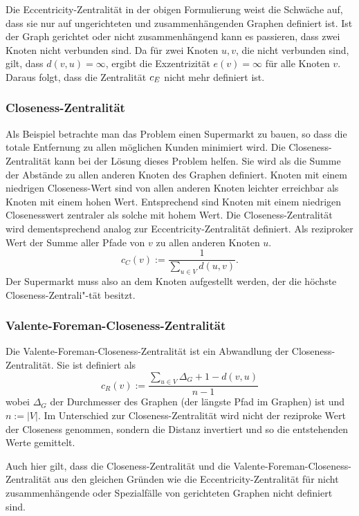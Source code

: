 Die Eccentricity-Zentralität in der obigen Formulierung weist die Schwäche auf, dass sie nur auf ungerichteten und zusammenhängenden Graphen definiert ist. Ist der Graph gerichtet oder nicht zusammenhängend kann es passieren, dass zwei Knoten nicht verbunden sind. Da für zwei Knoten $u,v$, die nicht verbunden sind, gilt, dass $d(v,u) = \infty$, ergibt die Exzentrizität $e(v) = \infty$ für alle Knoten $v$. Daraus folgt, dass die Zentralität $c_{E}$ nicht mehr definiert ist.

\subsubsection{Closeness-Zentralität}

Als Beispiel betrachte man das Problem einen Supermarkt zu bauen, so dass die totale Entfernung zu allen möglichen Kunden minimiert wird. Die Closeness-Zentralität kann bei der Lösung dieses Problem helfen. Sie wird als die Summe der Abstände zu allen anderen Knoten des Graphen definiert. Knoten mit einem niedrigen Closeness-Wert sind von allen anderen Knoten leichter erreichbar als Knoten mit einem hohen Wert. Entsprechend sind Knoten mit einem niedrigen Closenesswert zentraler als solche mit hohem Wert. Die Closeness-Zentralität wird dementsprechend analog zur Eccentricity-Zentralität definiert. Als reziproker Wert der Summe aller Pfade von $v$ zu allen anderen Knoten $u$.
\[c_C(v) := \frac{1}{\sum_{u \in V}d(u,v)}\mbox{.}\]
Der Supermarkt muss also an dem Knoten aufgestellt werden, der die höchste Closeness-Zentrali"-tät besitzt.

\subsubsection{Valente-Foreman-Closeness-Zentralität} 

Die Valente-Foreman-Closeness-Zentralität ist ein Abwandlung der Closeness-Zentralität. Sie ist definiert als 
\[
  c_R(v) := \frac{\sum_{u \in V}\Delta_G + 1 - d(v,u)}{n-1}
\] 
wobei $\Delta_G$ der Durchmesser des Graphen (der längste Pfad im Graphen) ist und $n := |V|$. Im Unterschied zur Closeness-Zentralität wird nicht der reziproke Wert der Closeness genommen, sondern die Distanz invertiert und so die entstehenden Werte gemittelt. 

Auch hier gilt, dass die Closeness-Zentralität und die Valente-Foreman-Closeness-Zentralität aus den gleichen Gründen wie die Eccentricity-Zentralität für nicht zusammenhängende oder Spezialfälle von gerichteten Graphen nicht definiert sind.

